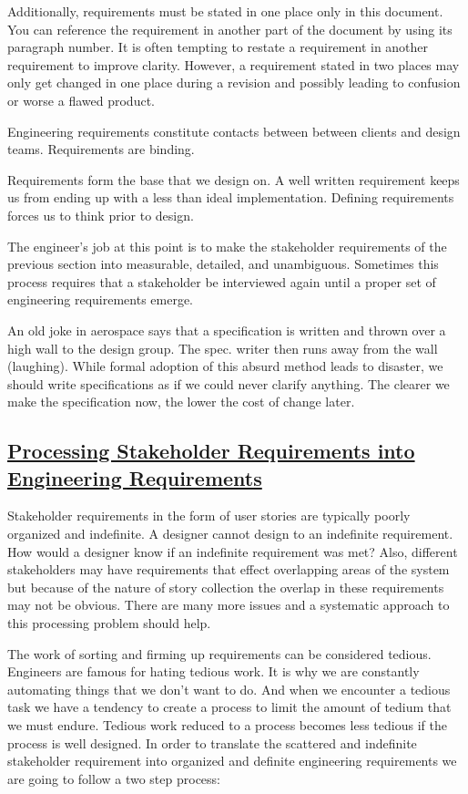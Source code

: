 \begin{slshape}
Additionally, requirements must be stated in one place only in this document.  You can reference the requirement in another part of the document by using its paragraph number.  It is often tempting to restate a requirement in another requirement to improve clarity.  However, a requirement stated in two places may only get changed in one place during a revision and possibly  leading to confusion or worse a flawed product.
\bigskip
		
Engineering requirements constitute contacts between between clients and design teams.  Requirements are binding.
\bigskip		
		
Requirements form the base that we design on.  A well written requirement keeps us from ending up with a less than ideal implementation.  
Defining requirements forces us to think prior to design.
\bigskip
		
The engineer's job at this point is to make the stakeholder requirements of the previous section into measurable, detailed, and unambiguous.  
Sometimes this process requires that a stakeholder be interviewed again until a proper set of engineering requirements emerge.
\bigskip 

An old joke in aerospace says that a specification is written and thrown over a high wall to the design group.  The spec. writer then runs away from the wall (laughing).  While formal adoption of this absurd method leads to disaster, we should write specifications as if we could never clarify anything.  The clearer we make the specification now, the lower the cost of change later.
\bigskip



\subsection*{\underline{Processing Stakeholder Requirements into Engineering Requirements}}

Stakeholder requirements in the form of user stories are typically poorly organized and indefinite.  A designer cannot design to an indefinite requirement.  How would a designer know if an indefinite requirement was met?  Also, different stakeholders may have requirements that effect overlapping areas of the system but because of the nature of story collection the overlap in these requirements may not be obvious.  There are many more issues and a systematic approach to this processing problem should help. 
\bigskip

The work of sorting and firming up requirements can be considered tedious.  Engineers are famous for hating tedious work.  It is why we are constantly automating things that we don't want to do.  And when we encounter a tedious task we have a tendency to create a process to limit the amount of tedium that we must endure.  Tedious work reduced to a process becomes less tedious if the process is well designed.  In order to translate the scattered and indefinite stakeholder requirement into organized and definite engineering requirements we are going to follow a two step process:


\end{slshape}
